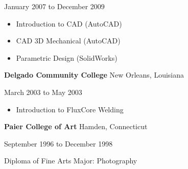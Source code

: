\documentclass[9pt]{extarticle}
\begin{document}
January 2007 to December 2009

\begin{itemize}
    \item Introduction to CAD (AutoCAD) 
    \item CAD 3D Mechanical (AutoCAD)
    \item Parametric Design (SolidWorks)
    \end{itemize}

\hfill

\textbf{Delgado Community College} \hfill New Orleans, Louisiana

March 2003 to May 2003
\begin{itemize}
    \item Introduction to Flux­Core Welding
\end{itemize}
\hfill

\textbf{Paier College of Art}  \hfill Hamden, Connecticut

September 1996 to December 1998  

Diploma of Fine Arts \hfill Major: Photography
\end{document}
